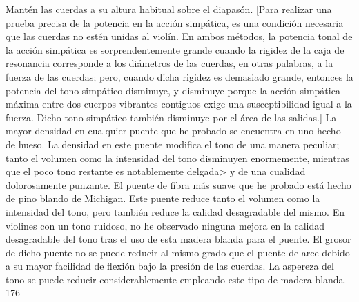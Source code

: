 Mantén las cuerdas a su altura habitual sobre el diapasón.
[Para realizar una prueba precisa de la potencia en la acción simpática, es una condición necesaria que las cuerdas no estén unidas al violín. En ambos métodos, la potencia tonal de la acción simpática es sorprendentemente grande cuando la rigidez de la caja de resonancia corresponde a los diámetros de las cuerdas, en otras palabras, a la fuerza de las cuerdas; pero, cuando dicha rigidez es demasiado grande, entonces la potencia del tono simpático disminuye, y disminuye porque la acción simpática máxima entre dos cuerpos vibrantes contiguos exige una susceptibilidad igual a la fuerza. Dicho tono simpático también disminuye por el área de las salidas.] La mayor densidad en cualquier puente que he probado se encuentra en uno hecho de hueso. La densidad en este puente modifica el tono de una manera peculiar; tanto el volumen como la intensidad del tono disminuyen enormemente, mientras que el poco tono restante es notablemente
delgada> y de una cualidad dolorosamente punzante.
El puente de fibra más suave que he probado está hecho de pino blando de Michigan. Este puente reduce tanto el volumen como la intensidad del tono, pero también reduce la calidad desagradable del mismo. En violines con un tono ruidoso, no he observado ninguna mejora en la calidad desagradable del tono tras el uso de esta madera blanda para el puente. El grosor de dicho puente no se puede reducir al mismo grado que el puente de arce debido a su mayor facilidad de flexión bajo la presión de las cuerdas. La aspereza del tono se puede reducir considerablemente empleando este tipo de madera blanda.
176

